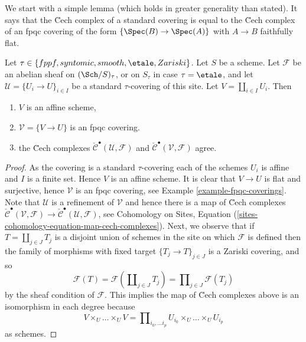 \noindent
We start with a simple lemma (which holds in greater generality than
stated). It says that the \u Cech complex of a standard covering is
equal to the \u Cech complex of an fpqc covering of the form
$\{\Spec(B) \to \Spec(A)\}$ with $A \to B$ faithfully flat.

\begin{lemma}
\label{lemma-cech-complex}
Let $\tau \in \{fppf, syntomic, smooth, \etale, Zariski\}$.
Let $S$ be a scheme.
Let $\mathcal{F}$ be an abelian sheaf on $(\Sch/S)_\tau$, or on
$S_\tau$ in case $\tau = \etale$, and let
$\mathcal{U} = \{U_i \to U\}_{i \in I}$
be a standard $\tau$-covering of this site.
Let $V = \coprod_{i \in I} U_i$. Then
\begin{enumerate}
\item $V$ is an affine scheme,
\item $\mathcal{V} = \{V \to U\}$ is an fpqc covering.
\item the \u Cech complexes
$\check{\mathcal{C}}^\bullet (\mathcal{U}, \mathcal{F})$ and
$\check{\mathcal{C}}^\bullet (\mathcal{V}, \mathcal{F})$ agree.
\end{enumerate}
\end{lemma}

\begin{proof}
As the covering is a standard $\tau$-covering each of the schemes
$U_i$ is affine and $I$ is a finite set. Hence $V$ is an affine scheme.
It is clear that $V \to U$ is flat and surjective, hence
$\mathcal{V}$ is an fpqc covering, see
Example \ref{example-fpqc-coverings}.
Note that $\mathcal{U}$ is a refinement of $\mathcal{V}$
and hence there is a map of \u Cech complexes
$\check{\mathcal{C}}^\bullet (\mathcal{V}, \mathcal{F}) \to
\check{\mathcal{C}}^\bullet (\mathcal{U}, \mathcal{F})$, see
Cohomology on Sites,
Equation (\ref{sites-cohomology-equation-map-cech-complexes}).
Next, we observe that if $T = \coprod_{j \in J} T_j$ is a
disjoint union of schemes in the site on which $\mathcal{F}$ is defined
then the family of morphisms with fixed target
$\{T_j \to T\}_{j \in J}$ is a Zariski covering, and so
\begin{equation}
\label{equation-sheaf-coprod}
\mathcal{F}(T) =
\mathcal{F}(\coprod\nolimits_{j \in J} T_j) =
\prod\nolimits_{j \in J} \mathcal{F}(T_j)
\end{equation}
by the sheaf condition of $\mathcal{F}$.
This implies the map of \u Cech complexes above is an isomorphism
in each degree because
$$
V \times_U \ldots \times_U V
=
\prod\nolimits_{i_0, \ldots i_p} U_{i_0} \times_U \ldots \times_U U_{i_p}
$$
as schemes.
\end{proof}

